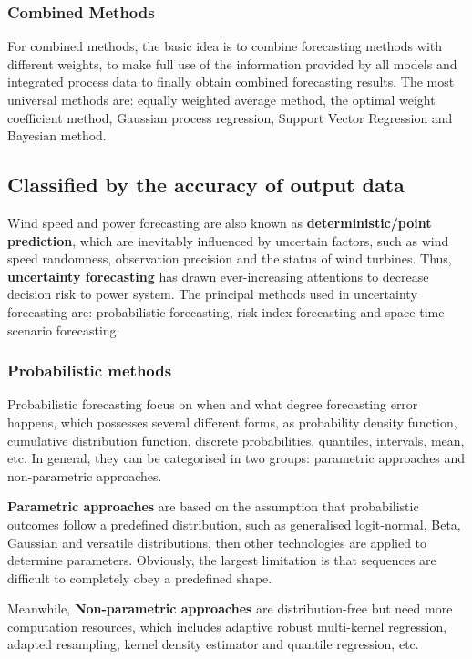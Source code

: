 \subsubsection{Combined Methods}

For combined methods, the basic idea is to combine forecasting methods with different weights, to make full use of the information provided by all models and integrated process data to finally obtain combined forecasting results. The most universal methods are: equally weighted average method, the optimal weight coefficient method, Gaussian process regression, Support Vector Regression and Bayesian method.

\subsection{Classified by the accuracy of output data}

Wind speed and power forecasting are also known as \textbf{deterministic/point prediction}, which are inevitably influenced by uncertain factors, such as wind speed randomness, observation precision and the status of wind turbines. Thus, \textbf{uncertainty forecasting} has drawn ever-increasing attentions to decrease decision risk to power system. The principal methods used in uncertainty forecasting are: probabilistic forecasting, risk index forecasting and space-time scenario forecasting.

\subsubsection{Probabilistic methods}

Probabilistic forecasting focus on when and what degree forecasting error happens, which possesses several different forms, as probability density function, cumulative distribution function, discrete probabilities, quantiles, intervals, mean, etc. In general, they can be categorised in two groups: parametric approaches and non-parametric approaches.

\textbf{Parametric approaches} are based on the assumption that probabilistic outcomes follow a predefined distribution, such as generalised logit-normal, Beta, Gaussian and versatile distributions, then other technologies are applied to determine parameters. Obviously, the largest limitation is that sequences are difficult to completely obey a predefined shape.

Meanwhile, \textbf{Non-parametric approaches} are distribution-free but need more computation resources, which includes adaptive robust multi-kernel regression, adapted resampling, kernel density estimator and quantile regression, etc.

